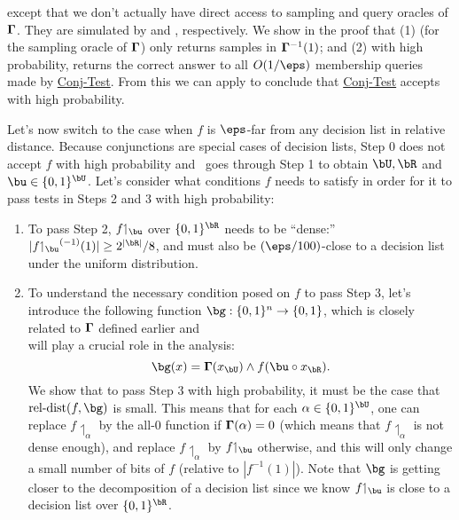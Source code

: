 \documentclass[11pt]{article}
\theoremstyle{definition}
\begin{document}
\noindent except that we don't actually have direct access to 
  sampling and query oracles of $\mathbf{\Gamma}$.
They are simulated by  and , respectively.
We show in the proof that (1)  (for the sampling oracle of $\mathbf{\Gamma}$) only returns samples in 
  $\mathbf{\Gamma}^{-1}(1)$; and (2) with high probability,
   returns the correct answer to all $O(1/\eps)$ membership queries made by \hyperlink{Algorithm2}{\sc Conj-Test}.
From this we can apply  to conclude that \hyperlink{Algorithm2}{\sc Conj-Test} accepts with high probability.
  

\medskip
{}
Let's now switch to the case when $f$ is $\eps$-far from
  any decision list in relative distance.
Because conjunctions are special cases of decision lists,
  Step 0 does not accept $f$ with high probability and 
  ~goes through Step 1 to obtain $\bU,\bR$ and $\bu\in \{0,1\}^{\bU}$.
Let's consider what conditions $f$ needs to satisfy 
  in order for it to pass tests in Steps 2 and 3 with high probability:
\begin{flushleft}
\begin{enumerate}
\item To pass Step 2,   $f{\upharpoonleft_{\bu}}$  over $\{0,1\}^{\bR}$ needs to be ``dense:'' $|f{\upharpoonleft_{\bu}}^{(-1)}(1)|\ge 2^{|\bR|}/8$, and 
  must also be $(\eps/100)$-close to a decision list under the uniform distribution.
\item To understand the necessary condition posed on $f$ to 
  pass Step 3, let's introduce the following function $\bg:\{0,1\}^n\rightarrow \{0,1\}$, which is closely related to $\mathbf{\Gamma}$ defined earlier and\\ will play a crucial role in the analysis:
$$
\bg(x)= \bGamma(x_{\bU}) \wedge f(\bu\circ x_{\bR}). 
$$
We show that to pass Step 3 with high probability,
  it must be the case that
  $\reldist(f,\bg)$ is small.
This means that for each $\alpha\in \{0,1\}^{\bU}$, one can replace $f{\upharpoonleft_{\alpha}}$ by the 
  all-$0$ function if $\mathbf{\Gamma}(\alpha)=0$ (which means that $f{\upharpoonleft_{\alpha}}$ is not dense enough),
  and replace $f{\upharpoonleft_{\alpha}}$ by 
  $f{\upharpoonleft_{\bu}}$ otherwise, and this will only change a small number of bits of $f$ (relative to $|f^{-1}(1)|$). 
  Note that $\bg$ is getting closer to the decomposition of a decision list 
  since we know $f{\upharpoonleft_{\bu}}$ is close to a decision list over $\{0,1\}^{\bR}$.
\end{enumerate}
\end{flushleft}
\end{document}
